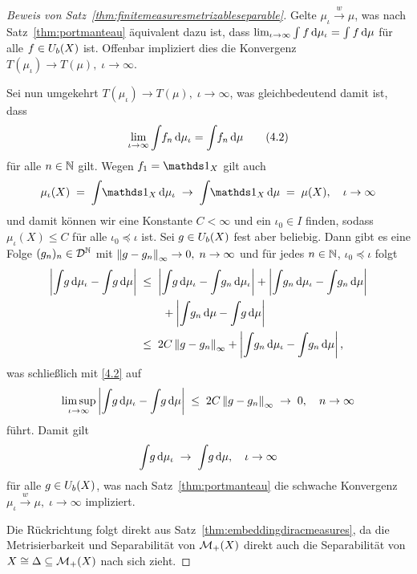 \documentclass[../main/main.tex]{subfiles}
\begin{document}
\begin{proof}[Beweis von Satz~\ref{thm:finitemeasuresmetrizableseparable}]
		Gelte $\mu_\iota \xrightarrow{w} \mu$, was nach Satz~\ref{thm:portmanteau} äquivalent dazu ist, dass $\lim_{\iota \to \infty} \int_{} \, f \, \mathrm{d}\mu_\iota = \int_{} \, f \, \mathrm{d}\mu$ für alle 
		$f \in U_b(X)$ ist. Offenbar impliziert dies die Konvergenz $T(\mu_\iota) \to T(\mu), \; \iota \to \infty$.
		
		Sei nun umgekehrt $T(\mu_\iota) \to T(\mu), \; \iota \to \infty$, was gleichbedeutend damit ist, dass 
		\[ \lim_{\iota \to \infty} \int_{} \, f_n \, \mathrm{d}\mu_\iota = \int_{} \, f_n \, \mathrm{d}\mu \label{4.2} \tag{4.2} \] 
		für alle $n \in \mathbb{N}$ gilt.
		Wegen $f_1 = \indfct_X$ gilt auch
		\[ \mu_\iota(X) \; = \; \measureint{}{\indfct_X}{\mu_\iota} \; \to \; \measureint{}{\indfct_X}{\mu} \; = \; \mu(X), \quad \iota \to \infty \]
		und damit können wir eine Konstante $C < \infty$ und ein $\iota_0 \in I$ finden, sodass $\mu_\iota(X) \leq C$ für alle $\iota_0 \preceq \iota$ ist.
		Sei $g \in U_b(X)$ fest aber beliebig. Dann gibt es eine Folge $(g_n)_n \in \mathcal{D}^{\mathbb{N}}$ mit $\left\lVert g - g_n\right\rVert_\infty \to 0, \; n \to \infty$ und für jedes $n \in \mathbb{N}$, $\iota_0 \preceq \iota$ folgt
		\begin{align*}
			\left| \int_{} \, g \, \mathrm{d}\mu_\iota - \int_{} \, g \, \mathrm{d}\mu \right| \; &\leq \; 
			\left| \int_{} \, g \, \mathrm{d}\mu_\iota - \int_{} \, g_n \, \mathrm{d}\mu_\iota \right| + 
			\left| \int_{} \, g_n \, \mathrm{d}\mu_\iota - \int_{} \, g_n \, \mathrm{d}\mu \right| \\
			& \qquad + 
			\left| \int_{} \, g_n \, \mathrm{d}\mu - \int_{} \, g \, \mathrm{d}\mu \right| \\
			&\leq \; 2 C \left\lVert g - g_n\right\rVert_\infty + \left| \int_{} \, g_n \, \mathrm{d}\mu_\iota - 
			\int_{} \, g_n \, \mathrm{d}\mu \right| \text{,}
		\end{align*}
		was schließlich mit \eqref{4.2} auf
		\[ \limsup_{\iota \to \infty} \left| \int_{} \, g \, \mathrm{d}\mu_\iota - \int_{} \, g \, \mathrm{d}\mu \right| \; \leq \; 2 C \left\lVert g - g_n\right\rVert_\infty \; \to \; 0, \quad n \to \infty \]
		führt. Damit gilt 
		\[ \int_{} \, g \, \mathrm{d}\mu_\iota \; \to \; \int_{} \, g \, \mathrm{d}\mu, \quad \iota \to \infty \]
		für alle $g \in U_b(X)$, was nach Satz~\ref{thm:portmanteau} die schwache Konvergenz $\mu_\iota \xrightarrow{w} \mu, \; \iota \to \infty$ impliziert.
		
		Die Rückrichtung folgt direkt aus Satz~\ref{thm:embeddingdiracmeasures}, da die Metrisierbarkeit und Separabilität von $\mathcal{M}_{+}(X)$ direkt auch die Separabilität von $X \cong \Delta \subseteq \mathcal{M}_{+}(X)$ nach sich zieht.
	\end{proof}
\end{document}
